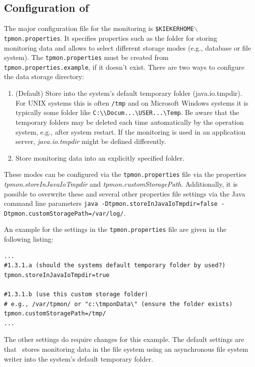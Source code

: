 \documentclass[a4paper,12pt]{scrartcl}
\begin{document}
\subsection{Configuration of \tpmon}
The major configuration file for the monitoring is \texttt{\$KIEKERHOME}$\backslash$\texttt{tpmon.properties}. It specifies properties such as the folder for storing monitoring data and allows to select different storage modes (e.g., database or file system). The \texttt{tpmon.properties} must be created from \texttt{tpmon.properties.example}, if it doesn't exist. There are two ways to configure the data storage directory:
\begin{enumerate}
\item (Default) Store into the system's default temporary folder (java.io.tmpdir). For UNIX systems this is often \texttt{/tmp} and on Microsoft Windows systems it is typically some folder like \verb=C:\\Docum...\USER...\Temp=. Be aware that the temporary folders may be deleted each time automatically by the operation system, e.g., after system restart. If the monitoring is used in an application server, \textit{java.io.tmpdir} might be defined differently.
\item Store monitoring data into an explicitly specified folder.
\end{enumerate}
These modes can be configured via the \texttt{tpmon.properties} file via the properties \textit{tpmon.storeInJavaIoTmpdir} and \textit{tpmon.customStoragePath}. Additionally, it is possible to overwrite these and several other properties file settings via the Java command line parameters \footnotesize \texttt{java -Dtpmon.storeInJavaIoTmpdir=false -Dtpmon.customStoragePath=/var/log/}. \normalsize

An example for the settings in the \texttt{tpmon.properties} file are given in the following listing:
\begin{lstlisting}[caption={Linux/Unix: Specification of the monitoring data storage location}]
...
#1.3.1.a (should the systems default temporary folder by used?)
tpmon.storeInJavaIoTmpdir=true

#1.3.1.b (use this custom storage folder)
# e.g., /var/tpmon/ or "c:\tmponData\" (ensure the folder exists)
tpmon.customStoragePath=/tmp/
...
\end{lstlisting}

The other settings do require changes for this example. The default settings are that \tpmon\ stores monitoring data in the file system using an asynchronous file system writer into the system's default temporary folder.
\end{document}

